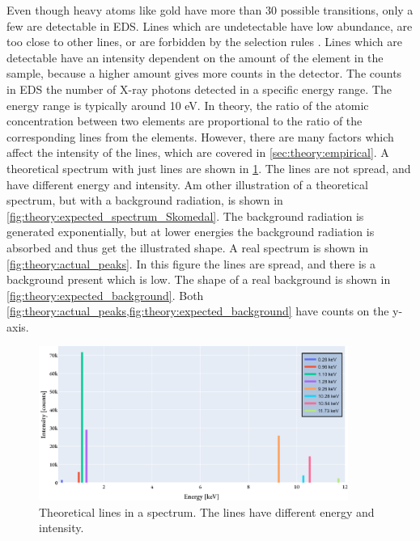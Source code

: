 Even though heavy atoms like gold have more than 30 possible transitions, only a few are detectable in EDS.
Lines which are undetectable have low abundance, are too close to other lines, or are forbidden by the selection rules \cite[Ch. 4.2.3]{goldstein_scanning_2018}.
Lines which are detectable have an intensity dependent on the amount of the element in the sample, because a higher amount gives more counts in the detector.
The counts in EDS the number of X-ray photons detected in a specific energy range.
The energy range is typically around 10 eV.
In theory, the ratio of the atomic concentration between two elements are proportional to the ratio of the corresponding lines from the elements.
However, there are many factors which affect the intensity of the lines, which are covered in \cref{sec:theory:empirical}.
A theoretical spectrum with just lines are shown in \cref{fig:theory:expected_lines}.
The lines are not spread, and have different energy and intensity.
Am other illustration of a theoretical spectrum, but with a background radiation, is shown in \cref{fig:theory:expected_spectrum_Skomedal}.
The background radiation is generated exponentially, but at lower energies the background radiation is absorbed and thus get the illustrated shape.
A real spectrum is shown in \cref{fig:theory:actual_peaks}.
In this figure the lines are spread, and there is a background present which is low.
The shape of a real background is shown in \cref{fig:theory:expected_background}.
Both \cref{fig:theory:actual_peaks,fig:theory:expected_background} have counts on the y-axis.


\begin{figure}[p]
    \centering
    \includegraphics[width=0.9\textwidth]{figures/expected_lines.png}
    \caption{
        Theoretical lines in a spectrum.
        The lines have different energy and intensity.
    }
    \label{fig:theory:expected_lines}
\end{figure}

